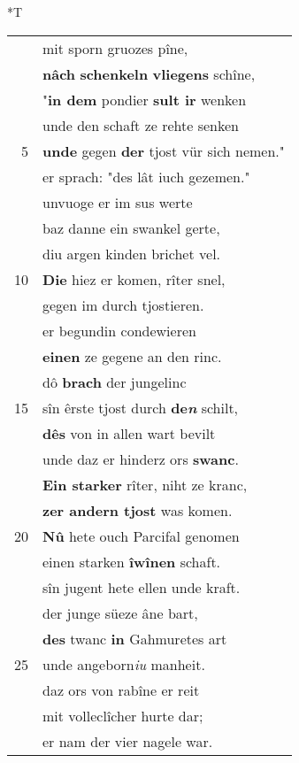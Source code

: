 \documentclass[8pt,a4paper,notitlepage]{article}
\begin{document}
\begin{table}[ht]
\begin{minipage}[t]{0.5\linewidth}
\end{minipage}
\hspace{0.5cm}
\begin{minipage}[t]{0.5\linewidth}
\small
\begin{center}*T
\end{center}
\begin{tabular}{rl}
 & mit sporn gruozes pîne,\\ 
 & \textbf{nâch} \textbf{schenkeln} \textbf{vliegens} schîne,\\ 
 & "\textbf{in dem} pondier \textbf{sult ir} wenken\\ 
 & unde den schaft ze rehte senken\\ 
5 & \textbf{unde} gegen \textbf{der} tjost vür sich nemen."\\ 
 & er sprach: "des lât iuch gezemen."\\ 
 & unvuoge er im sus werte\\ 
 & baz danne ein swankel gerte,\\ 
 & diu argen kinden brichet vel.\\ 
10 & \textbf{Die} hiez er komen, rîter snel,\\ 
 & gegen im durch tjostieren.\\ 
 & er begundin condewieren\\ 
 & \textbf{einen} ze gegene an den rinc.\\ 
 & dô \textbf{brach} der jungelinc\\ 
15 & sîn êrste tjost durch \textbf{de\textit{n}} schilt,\\ 
 & \textbf{dês} von in allen wart bevilt\\ 
 & unde daz er hinderz ors \textbf{swanc}.\\ 
 & \textbf{Ein starker} rîter, niht ze kranc,\\ 
 & \textbf{zer andern tjost} was komen.\\ 
20 & \textbf{Nû} hete ouch Parcifal genomen\\ 
 & einen starken \textbf{îwînen} schaft.\\ 
 & sîn jugent hete ellen unde kraft.\\ 
 & der junge süeze âne bart,\\ 
 & \textbf{des} twanc \textbf{in} Gahmuretes art\\ 
25 & unde angeborn\textit{iu} manheit.\\ 
 & daz ors von rabîne er reit\\ 
 & mit volleclîcher hurte dar;\\ 
 & er nam der vier nagele war.\\ 

\end{tabular}
\end{minipage}
\end{table}
\end{document}
